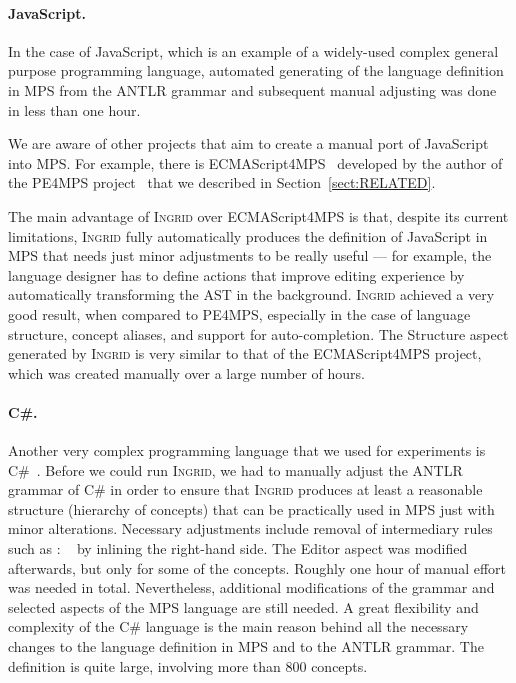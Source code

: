 \paragraph{JavaScript.}
In the case of JavaScript, which is an example of a widely-used complex general purpose programming language, automated generating of the language definition in MPS from the ANTLR grammar and subsequent manual adjusting was done in less than one hour.

We are aware of other projects that aim to create a manual port of JavaScript into MPS.
For example, there is ECMAScript4MPS~\cite{ref:ECMA4MPS} developed by the author of the PE4MPS project~\cite{ref:PE4MPS} that we described in Section~\ref{sect:RELATED}.

The main advantage of \textsc{Ingrid} over ECMAScript4MPS is that, despite its current limitations, \textsc{Ingrid} fully automatically produces the definition of JavaScript in MPS that needs just minor adjustments to be really useful --- for example, the language designer has to define actions that improve editing experience by automatically transforming the AST in the background.
\textsc{Ingrid} achieved a very good result, when compared to PE4MPS, especially in the case of language structure, concept aliases, and support for auto-completion.
The Structure aspect generated by \textsc{Ingrid} is very similar to that of the ECMAScript4MPS project, which was created manually over a large number of hours.

\paragraph{C\#.}
Another very complex programming language that we used for experiments is C\#~\cite{ref:CSHARP}.
Before we could run \textsc{Ingrid}, we had to manually adjust the ANTLR grammar of C\# in order to ensure that \textsc{Ingrid} produces at least a reasonable structure (hierarchy of concepts) that can be practically used in MPS just with minor alterations.
Necessary adjustments include removal of intermediary rules such as  : ~\antlrliteral{;} by inlining the right-hand side.
The Editor aspect was modified afterwards, but only for some of the concepts. 
Roughly one hour of manual effort was needed in total.
Nevertheless, additional modifications of the grammar and selected aspects of the MPS language are still needed.
A great flexibility and complexity of the C\# language is the main reason behind all the necessary changes to the language definition in MPS and to the ANTLR grammar.
The definition is quite large, involving more than 800 concepts.

